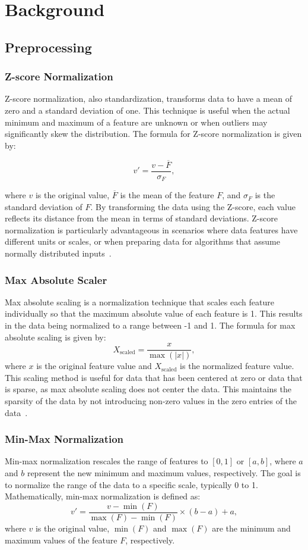 \section{Background}\label{sec:background}
\subsection{Preprocessing}

\subsubsection{Z-score Normalization}
Z-score normalization, also standardization, transforms data to have a mean of zero and a standard deviation of one.
This technique is useful when the actual minimum and maximum of a feature are unknown or when outliers may significantly skew the distribution.
The formula for Z-score normalization is given by:

$$ 
v' = \frac{v - \overline{F}}{\sigma_F},
$$

where $v$ is the original value, $\overline{F}$ is the mean of the feature $F$, and $\sigma_F$ is the standard deviation of $F$. 
By transforming the data using the Z-score, each value reflects its distance from the mean in terms of standard deviations.
Z-score normalization is particularly advantageous in scenarios where data features have different units or scales, or when preparing data for algorithms that assume normally distributed inputs~\cite{dataminingConcepts}.

\subsubsection{Max Absolute Scaler}
Max absolute scaling is a normalization technique that scales each feature individually so that the maximum absolute value of each feature is 1. 
This results in the data being normalized to a range between -1 and 1.
The formula for max absolute scaling is given by:
$$
	X_{\text{scaled}} = \frac{x}{\max(|x|)},
$$
where $x$ is the original feature value and $X_{\text{scaled}}$ is the normalized feature value.
This scaling method is useful for data that has been centered at zero or data that is sparse, as max absolute scaling does not center the data. 
This maintains the sparsity of the data by not introducing non-zero values in the zero entries of the data~\cite{Vasques2024}.


\subsubsection{Min-Max Normalization}\label{subsec:min-max}
Min-max normalization rescales the range of features to $[0, 1]$ or $[a, b]$, where $a$ and $b$ represent the new minimum and maximum values, respectively. 
The goal is to normalize the range of the data to a specific scale, typically 0 to 1. 
Mathematically, min-max normalization is defined as:
$$ 
	v' = \frac{v - \min(F)}{\max(F) - \min(F)} \times (b - a) + a,
$$
where $v$ is the original value, $\min(F)$ and $\max(F)$ are the minimum and maximum values of the feature $F$, respectively. 

